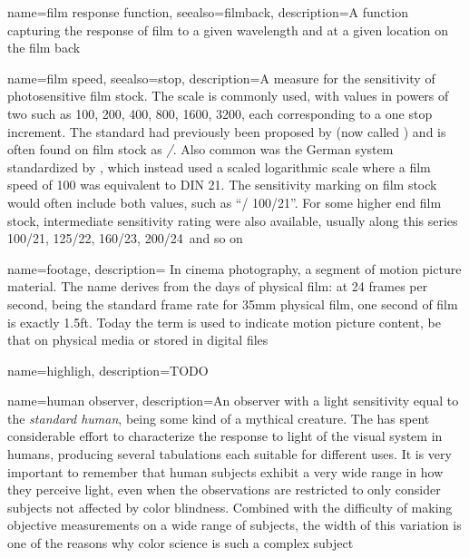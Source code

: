 {
	name={film response function},
	seealso={filmback},
	description={A function capturing the response of film to a given wavelength and at a
		given location on the film back}
}

{
	name={film speed},
	seealso={stop},
	description={A measure for the sensitivity of photosensitive film stock. 
		The  scale is commonly used, with values in powers of two such 
		as 100, 200, 400, 800, 1600, 3200, each corresponding to a one stop increment. 
		The standard had previously been proposed by 
		(now called ) and is often found on film stock as 
		\textsl{/}. 
		Also common was the German system standardized by , which instead 
		used a scaled logarithmic scale where a film speed of  100 was equivalent 
		to DIN 21\degree. 
		The sensitivity marking on film stock would often include both values, 
		such as ``/ 100/21\degree''. 
		For some higher end film stock, intermediate
		sensitivity rating were also available, usually along this series
		100/21\degree, 125/22\degree, 160/23\degree, 200/24\degree\ and so on}
}

{
	name=footage,
	description={
		In cinema photography, a segment of motion picture material. The name derives from
	    the days of physical film: at 24 frames per second, being the standard frame rate for
    	35\unit{\milli\meter} physical film, one second of film is exactly 1.5ft.
    	Today the term is used to indicate motion picture content, be that on physical
        media or stored in digital files}
}

{
	name=highligh,
	description={TODO}
}

{    
	name={human observer},
	description={An observer with a light sensitivity equal to the \textsl{standard human},
		being some kind of a mythical creature.
		The  has spent considerable effort to characterize the response to light 
		of the visual system in humans, producing several tabulations each suitable for
		different uses. 
		It is very important to remember that human subjects exhibit a very wide range 
		in how they perceive light, even when the observations are restricted to only 
		consider subjects not affected by color blindness.
		Combined with the difficulty of making objective measurements on a wide range 
		of subjects, the width of this variation is one of the reasons why color science is
		such a complex subject}
}

